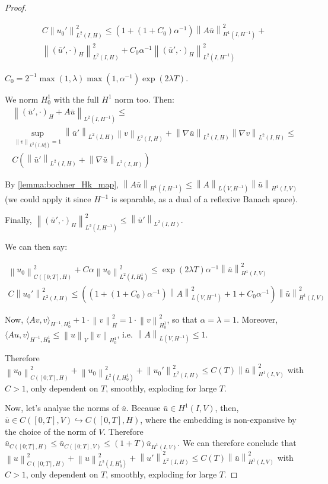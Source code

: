 \documentclass[english,a4paper,12pt,oneside]{scrbook}
\theoremstyle{break}
\newenvironment{mproof}[1][\proofname]{%
  \begin{proof}[#1]$ $\par\nobreak\ignorespaces
}{%
  \end{proof}
}
\renewcommand*{\proofname}{Proof}
\theoremstyle{remark}
\newcommand{\ds}{\displaystyle}
\newcommand{\norm}[1]{\left\lVert#1\right\rVert}
\newcommand{\HN}[1]{\norm{#1}_{H}}
\newcommand{\VN}[1]{\norm{#1}_{V}}
\newcommand{\emb}{\hookrightarrow}
\begin{document}
\begin{mproof}
\begin{align*}
C\norm{u_0'}^2_{L^2(I,H)}\leq 
(1+(1+C_0)\alpha^{-1})\norm{A \bar{u}}^2_{H^1(I, H^{-1})}+\\
\norm{(\bar{u}',\cdot)_H}_{L^2(I,H)}^2+C_0\alpha^{-1}\norm{(\bar{u}',\cdot)_H}^2_{L^2(I,H^{-1})}
\end{align*}

$C_0 = \ds 2^{-1}\max(1,\lambda)\max(1,\alpha^{-1})\exp(2\lambda T)$.

We norm $H^1_0$ with the full $H^1$ norm too. Then:
\begin{align*}
\norm{(\bar{u}',\cdot)_H+ A \bar{u}}_{L^2(I,H^{-1})}\leq \\
\sup_{\norm{v}_{L^2(I,H^{1}_0)}=1}\norm{\bar{u}'}_{L^2(I,H)}\norm{v}_{L^2(I,H)}+\norm{\nabla \bar{u}}_{L^2(I,H)}\norm{\nabla v}_{L^2(I,H)}\leq \\C(\norm{\bar{u}'}_{L^2(I,H)}+\norm{\nabla \bar{u}}_{L^2(I,H)})
\end{align*}

By \cref{lemma:bochner_Hk_map}, $\norm{A \bar{u}}_{H^1(I, H^{-1})}\leq \norm{A}_{L(V,H^{-1})}\norm{\bar{u}}_{H^1(I,V)}$ (we could apply it since $H^{-1}$ is separable, as a dual of a reflexive Banach space).

Finally, $\norm{(\bar{u}',\cdot)_H}^2_{L^2(I,H^{-1})}\leq \norm{\bar{u}'}_{L^2(I,H)}$.

We can then say:

\begin{align*}
\norm{u_0}^2_{C([0;T],H)}+C\alpha\norm{u_0}_{L^2(I,H^1_0)}^2\leq \exp(2\lambda T)\alpha^{-1}\norm{\bar{u}}^2_{H^1(I,V)}\\
C\norm{u_0'}^2_{L^2(I,H)}\leq 
((1+(1+C_0)\alpha^{-1})\norm{A}_{L(V,H^{-1})}^2 +1 +C_0\alpha^{-1})\norm{\bar{u}}^2_{H^1(I,V)}
\end{align*}

Now, $\langle Av, v\rangle_{H^{-1}, H^1_0} + 1\cdot  \HN{v}^2 = 1\cdot \norm{v}_{H^1_0}^2$, so that $\alpha=\lambda=1$. Moreover, $\langle Au, v\rangle_{H^{-1}, H^1_0}\leq \VN{u}\norm{v}_{H^1_0}$, i.e. $\norm{A}_{L(V,H^{-1})}\leq 1$.

Therefore $\norm{u_0}^2_{C([0;T],H)}+\norm{u_0}_{L^2(I,H^1_0)}^2 + \norm{u_0'}^2_{L^2(I,H)}\leq C(T)\norm{\bar{u}}_{H^1(I,V)}^2$ with $C>1$, only dependent on $T$, smoothly, exploding for large $T$.

Now, let's analyse the norms of $\bar{u}$. Because $\bar{u}\in H^1(I,V)$, then, $\bar{u} \in C([0,T],V)\emb C([0,T],H)$, where the embedding is non-expansive by the choice of the norm of $V$. Therefore $\bar{u}_{C([0;T],H)}\leq \bar{u}_{C([0;T],V)}\leq (1+T)\bar{u}_{H^1(I,V)}$. We can therefore conclude that $\norm{u}^2_{C([0;T],H)}+\norm{u}_{L^2(I,H^1_0)}^2 + \norm{u'}^2_{L^2(I,H)}\leq C(T)\norm{\bar{u}}_{H^1(I,V)}^2$ with $C>1$, only dependent on $T$, smoothly, exploding for large $T$.



\end{mproof}
\end{document}
